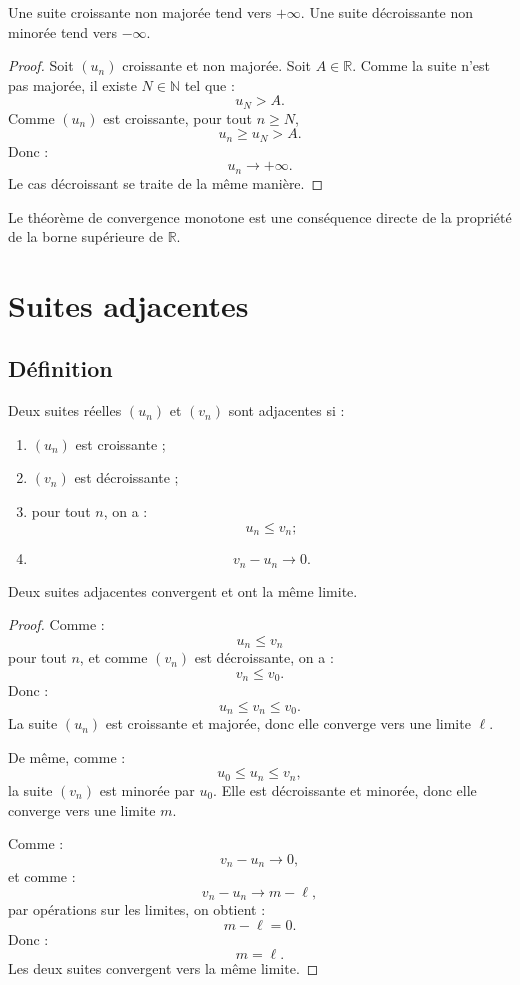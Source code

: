 \documentclass[11pt,a4paper]{article}
\newcommand{\N}{\mathbb N}
\newcommand{\R}{\mathbb R}
\begin{document}
\begin{theorembox}
Une suite croissante non majorée tend vers \(+\infty\).  
Une suite décroissante non minorée tend vers \(-\infty\).
\end{theorembox}

\begin{proof}
Soit \((u_n)\) croissante et non majorée.  
Soit \(A\in\R\).  
Comme la suite n'est pas majorée, il existe \(N\in\N\) tel que :
\[
u_N>A.
\]
Comme \((u_n)\) est croissante, pour tout \(n\geq N\),
\[
u_n\geq u_N>A.
\]
Donc :
\[
u_n\to+\infty.
\]
Le cas décroissant se traite de la même manière.
\end{proof}

\begin{retenirbox}
Le théorème de convergence monotone est une conséquence directe de la propriété de la borne supérieure de \(\R\).
\end{retenirbox}

\section{Suites adjacentes}

\subsection{Définition}

\begin{definitionbox}
Deux suites réelles \((u_n)\) et \((v_n)\) sont adjacentes si :
\begin{enumerate}
    \item \((u_n)\) est croissante ;
    \item \((v_n)\) est décroissante ;
    \item pour tout \(n\), on a :
    \[
    u_n\leq v_n ;
    \]
    \item
    \[
    v_n-u_n\to0.
    \]
\end{enumerate}
\end{definitionbox}

\begin{theorembox}
Deux suites adjacentes convergent et ont la même limite.
\end{theorembox}

\begin{proof}
Comme :
\[
u_n\leq v_n
\]
pour tout \(n\), et comme \((v_n)\) est décroissante, on a :
\[
v_n\leq v_0.
\]
Donc :
\[
u_n\leq v_n\leq v_0.
\]
La suite \((u_n)\) est croissante et majorée, donc elle converge vers une limite \(\ell\).

De même, comme :
\[
u_0\leq u_n\leq v_n,
\]
la suite \((v_n)\) est minorée par \(u_0\).  
Elle est décroissante et minorée, donc elle converge vers une limite \(m\).

Comme :
\[
v_n-u_n\to0,
\]
et comme :
\[
v_n-u_n\to m-\ell,
\]
par opérations sur les limites, on obtient :
\[
m-\ell=0.
\]
Donc :
\[
m=\ell.
\]
Les deux suites convergent vers la même limite.
\end{proof}
\end{document}
